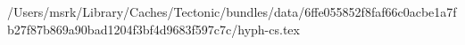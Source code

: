 /Users/msrk/Library/Caches/Tectonic/bundles/data/6ffe055852f8faf66c0acbe1a7fb27f87b869a90bad1204f3bf4d9683f597c7c/hyph-cs.tex